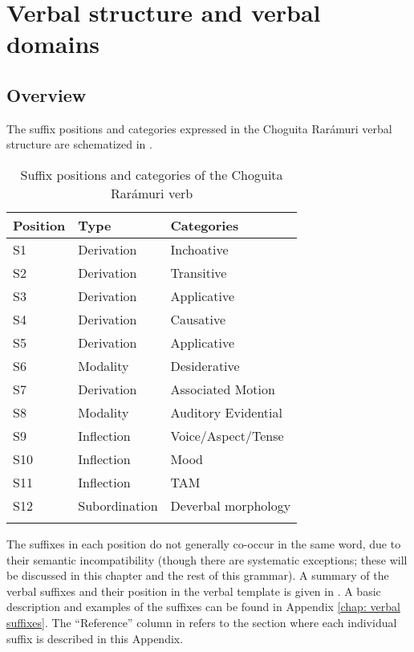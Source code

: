 \section{Verbal structure and verbal domains}
\label{sec: verbal structure and verbal domains}

\subsection{Overview}
\label{subsec: overview}

The suffix positions and categories expressed in the Choguita Rarámuri verbal structure are schematized in .

\begin{table}
\caption{Suffix positions and categories of the Choguita Rarámuri verb}
\label{tab:suffix-positions}

\begin{tabularx}{.65\textwidth}{lll}
\lsptoprule
\textbf{Position} & \textbf{Type} & \textbf{Categories}\\
\midrule
S1 & Derivation & Inchoative\\
S2 & Derivation & Transitive\\
S3 & Derivation & Applicative\\
S4 & Derivation & Causative\\
S5 & Derivation & Applicative\\
S6 & Modality & Desiderative\\
S7 & Derivation & Associated Motion\\
S8 & Modality & Auditory Evidential\\
S9 & Inflection & Voice/Aspect/Tense\\
S10 & Inflection & Mood\\
S11 & Inflection & TAM\\
S12 & Subordination & Deverbal morphology\\
\lspbottomrule
\end{tabularx}
\end{table}

The suffixes in each position do not generally co-occur in the same word, due to their semantic incompatibility (though there are systematic exceptions; these will be discussed in this chapter and the rest of this grammar).
A summary of the verbal suffixes and their position in the verbal template is given in . A basic description and examples of the suffixes can be found in Appendix \ref{chap: verbal suffixes}. The ``Reference'' column in  refers to the section where each individual suffix is described in this Appendix.

